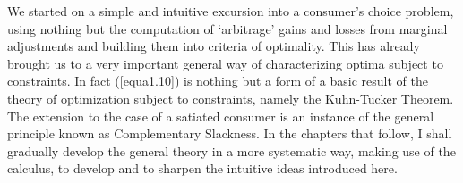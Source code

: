 We started on a simple and intuitive excursion into a consumer's choice problem, using nothing but the computation of `arbitrage' gains and losses from marginal adjustments and building them into criteria of optimality. This has already brought us to a very important general way of characterizing optima subject to constraints. In fact (\ref{equa1.10}) is nothing but a form of a basic result of the theory of optimization subject to constraints, namely the Kuhn-Tucker Theorem. The extension to the case of a satiated consumer is an instance of the general principle known as Complementary Slackness. In the chapters that follow, I shall gradually develop the general theory in a more systematic way, making use of the calculus, to develop and to sharpen the intuitive ideas introduced here.

